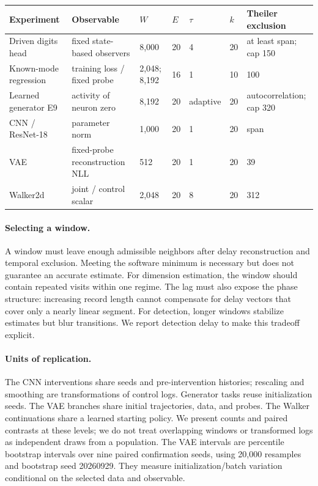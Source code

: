 {\begin{table}[t]
\centering\small
\caption{}
\begin{tabular}{lllllll}
\toprule
Experiment & Observable & $W$ & $E$ & $\tau$ & $k$ & Theiler exclusion \\
\midrule
Driven digits head & fixed state-based observers & 8,000 & 20 & 4 & 20 & at least span; cap 150 \\
Known-mode regression & training loss / fixed probe & 2,048; 8,192 & 16 & 1 & 10 & 100 \\
Learned generator E9 & activity of neuron zero & 8,192 & 20 & adaptive & 20 & autocorrelation; cap 320 \\
CNN / ResNet-18 & parameter norm & 1,000 & 20 & 1 & 20 & span \\
VAE & fixed-probe reconstruction NLL & 512 & 20 & 1 & 20 & 39 \\
Walker2d & joint / control scalar & 2,048 & 20 & 8 & 20 & 312 \\
\bottomrule
\end{tabular}
\end{table}

\paragraph{Selecting a window.}
A window must leave enough admissible neighbors after delay reconstruction and temporal exclusion. Meeting the software minimum is necessary but does not guarantee an accurate estimate. For dimension estimation, the window should contain repeated visits within one regime. The lag must also expose the phase structure: increasing record length cannot compensate for delay vectors that cover only a nearly linear segment. For detection, longer windows stabilize estimates but blur transitions. We report detection delay to make this tradeoff explicit.

\paragraph{Units of replication.}
The CNN interventions share seeds and pre-intervention histories; rescaling and smoothing are transformations of control logs. Generator tasks reuse initialization seeds. The VAE branches share initial trajectories, data, and probes. The Walker continuations share a learned starting policy. We present counts and paired contrasts at these levels; we do not treat overlapping windows or transformed logs as independent draws from a population. The VAE intervals are percentile bootstrap intervals over nine paired confirmation seeds, using 20,000 resamples and bootstrap seed 20260929. They measure initialization/batch variation conditional on the selected data and observable.

}
